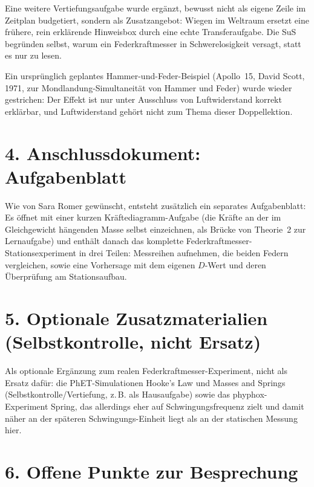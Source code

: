 \documentclass[11pt,a4paper]{article}
\begin{document}
Eine weitere Vertiefungsaufgabe wurde ergänzt, bewusst nicht als eigene
Zeile im Zeitplan budgetiert, sondern als Zusatzangebot: \glqq Wiegen im
Weltraum\grqq{} ersetzt eine frühere, rein erklärende Hinweisbox durch eine
echte Transferaufgabe. Die SuS begründen selbst, warum ein Federkraftmesser
in Schwerelosigkeit versagt, statt es nur zu lesen.

Ein ursprünglich geplantes Hammer-und-Feder-Beispiel (Apollo~15, David
Scott, 1971, zur Mondlandung-Simultaneität von Hammer und Feder) wurde
wieder gestrichen: Der Effekt ist nur unter Ausschluss von Luftwiderstand
korrekt erklärbar, und Luftwiderstand gehört nicht zum Thema dieser
Doppellektion.

\section*{4. Anschlussdokument: Aufgabenblatt}

Wie von Sara Romer gewünscht, entsteht zusätzlich ein separates
Aufgabenblatt: Es öffnet mit einer kurzen Kräftediagramm-Aufgabe (die
Kräfte an der im Gleichgewicht hängenden Masse selbst einzeichnen, als
Brücke von Theorie~2 zur Lernaufgabe) und enthält danach das komplette
Federkraftmesser-Stationsexperiment in drei Teilen: Messreihen aufnehmen,
die beiden Federn vergleichen, sowie eine Vorhersage mit dem eigenen
$D$-Wert und deren Überprüfung am Stationsaufbau.

\section*{5. Optionale Zusatzmaterialien (Selbstkontrolle, nicht Ersatz)}

Als optionale Ergänzung zum realen Federkraftmesser-Experiment, nicht als
Ersatz dafür: die PhET-Simulationen \glqq Hooke's Law\grqq{} und \glqq
Masses and Springs\grqq{} (Selbstkontrolle/Vertiefung, z.\,B. als
Hausaufgabe) sowie das phyphox-Experiment \glqq Spring\grqq{}, das
allerdings eher auf Schwingungsfrequenz zielt und damit näher an der
späteren Schwingungs-Einheit liegt als an der statischen Messung hier.

\section*{6. Offene Punkte zur Besprechung}
\end{document}
